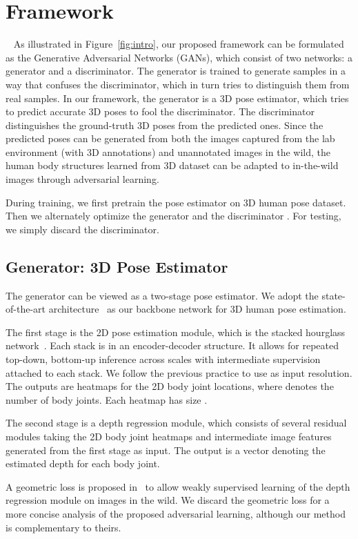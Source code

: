 \documentclass[10pt,twocolumn,letterpaper]{article}
\begin{document}
\section{Framework} ~\label{sec:framework}
As illustrated in Figure~\ref{fig:intro}, our proposed framework can be formulated as the Generative Adversarial Networks (GANs), which consist of two networks: a generator and a discriminator. 
The generator is trained to generate samples in a way that confuses the discriminator, which in turn tries to distinguish them from real samples. 
In our framework, the generator  is a 3D pose estimator, which tries to predict accurate 3D poses to fool the discriminator. 
The discriminator  distinguishes the ground-truth 3D poses from the predicted ones.  
Since the predicted poses can be generated from both the images captured from the lab environment (with 3D annotations) and unannotated images in the wild, the human body structures learned from 3D dataset can be adapted to in-the-wild images through adversarial learning. 


During training, we first pretrain the pose estimator  on 3D human pose dataset. 
Then we alternately optimize the generator  and the discriminator . 
For testing, we simply discard the discriminator. 


\subsection{Generator: 3D Pose Estimator}  
The generator can be viewed as a two-stage pose estimator. 
We adopt the state-of-the-art architecture~\cite{zhou2017towards} as our backbone network for 3D human pose estimation.

The first stage is the 2D pose estimation module, which is the stacked hourglass network~\cite{newell2016stacked}. 
Each stack is in an encoder-decoder structure. 
It allows for repeated top-down, bottom-up inference across scales with intermediate supervision attached to each stack. 
We follow the previous practice to use  as input resolution. 
The outputs are  heatmaps for the 2D body joint locations, where  denotes the number of body joints. 
Each heatmap has size . 

The second stage is a depth regression module, which consists of several residual modules taking the 2D body joint heatmaps and intermediate image features generated from the first stage as input. 
The output is a  vector denoting the estimated depth for each body joint. 

A geometric loss is proposed in~\cite{zhou2017towards} to allow weakly supervised learning of the depth regression module on images in the wild. 
We discard the geometric loss for a more concise analysis of the proposed adversarial learning, although our method is complementary to theirs. 
\end{document}
